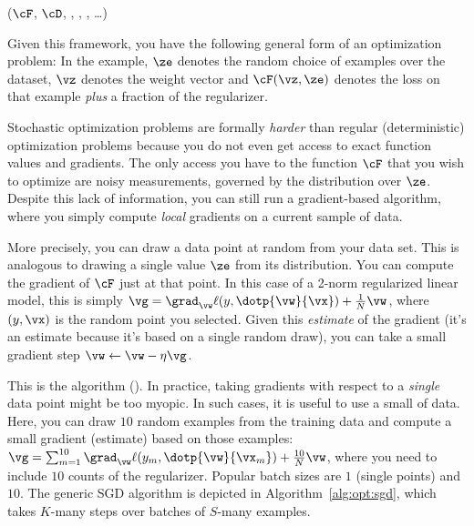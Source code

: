 %
  {($\cF$, $\cD$, , , , \dots)}
  {
\SETST{$\vz\kth$}{$\VARm{\vz\kpth} - \VARm{\eta}\VARm{\kth} \VARm{\vg\kth}$}
\ENDFOR
\RETURN \VARm{$\vz\Kth$}
}

Given this framework, you have the following general form of an
optimization problem:
%
%
In the example, $\ze$ denotes the random choice of examples over the
dataset, $\vz$ denotes the weight vector and $\cF(\vz,\ze)$ denotes
the loss on that example \emph{plus} a fraction of the regularizer.

Stochastic optimization problems are formally \emph{harder} than
regular (deterministic) optimization problems because you do not even
get access to exact function values and gradients.  The only access
you have to the function $\cF$ that you wish to optimize are noisy
measurements, governed by the distribution over $\ze$.  Despite this
lack of information, you can still run a gradient-based algorithm,
where you simply compute \emph{local} gradients on a current sample of
data.

More precisely, you can draw a data point at random from your data
set.  This is analogous to drawing a single value $\ze$ from its
distribution.  You can compute the gradient of $\cF$ just at that
point.  In this case of a 2-norm regularized linear model, this is
simply $\vg = \grad_{\vw} \ell(y, \dotp{\vw}{\vx}) + \frac 1 N \vw$,
where $(y,\vx)$ is the random point you selected.  Given this
\emph{estimate} of the gradient (it's an estimate because it's based
on a single random draw), you can take a small gradient step $\vw
\leftarrow \vw - \eta \vg$.

This is the  algorithm
().  In practice, taking gradients with respect to a
\emph{single} data point might be too myopic.  In such cases, it is
useful to use a small  of data.  Here, you can draw
$10$ random examples from the training data and compute a small
gradient (estimate) based on those examples: $\vg = \sum_{m=1}^{10}
\grad_{\vw} \ell(y_m, \dotp{\vw}{\vx_m}) + \frac {10} N \vw$, where
you need to include $10$ counts of the regularizer.  Popular batch
sizes are $1$ (single points) and $10$.  The generic SGD algorithm is
depicted in Algorithm~\ref{alg:opt:sgd}, which takes $K$-many steps
over batches of $S$-many examples.


